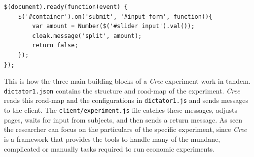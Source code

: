 \documentclass[preprint, 12pt]{elsarticle}
\newcommand{\Cree}{\emph{Cree}\xspace}
\begin{document}
\begin{lstlisting}[caption={Snippet from the client script -- \texttt{client/experiment.js}},label=client]
$(document).ready(function(event) { 
	$('#container').on('submit', '#input-form', function(){
		var amount = Number($('#slider input').val());
		cloak.message('split', amount);
		return false; 
	});
});
\end{lstlisting}

This is how the three main building blocks of a \Cree experiment work in tandem. \texttt{dictator1.json} contains the structure and road-map of the experiment. \Cree reads this road-map and the configurations in \texttt{dictator1.js} and sends messages to the client. The \texttt{client/experiment.js} file catches these messages, adjusts pages, waits for input from subjects, and then sends a return message. As seen the researcher can focus on the particulars of the specific experiment, since \Cree is a framework that provides the tools to handle many of the mundane, complicated or manually tasks required to run economic experiments.

\newpage


\raggedright
\singlespacing

\end{document}
